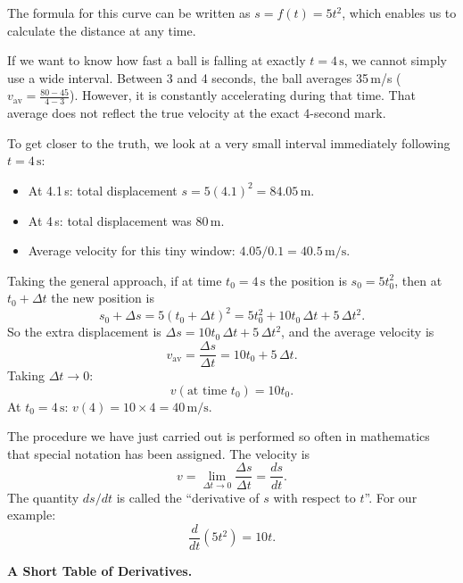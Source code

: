 The formula for this curve can be written as $s = f(t) = 5t^2$, which enables us to calculate
the distance at any time.

If we want to know how fast a ball is falling at exactly $t=4\,\text{s}$, we cannot simply
use a wide interval. Between 3 and 4 seconds, the ball averages 35\,m/s
($v_\text{av}=\frac{80-45}{4-3}$). However, it is constantly accelerating during that time.
That average does not reflect the true velocity at the exact 4-second mark.

To get closer to the truth, we look at a very small interval immediately following $t=4\,\text{s}$:
\begin{itemize}
  \item At 4.1\,s: total displacement $s=5(4.1)^2=84.05\,\text{m}$.
  \item At 4\,s: total displacement was 80\,m.
  \item Average velocity for this tiny window: $4.05/0.1=40.5\,\text{m/s}$.
\end{itemize}

Taking the general approach, if at time $t_0=4\,\text{s}$ the position is $s_0=5t_0^2$, then at
$t_0+\Delta t$ the new position is
\[
  s_0+\Delta s = 5(t_0+\Delta t)^2 = 5t_0^2+10t_0\,\Delta t+5\,\Delta t^2.
\]
So the extra displacement is $\Delta s = 10t_0\,\Delta t+5\,\Delta t^2$, and the average velocity is
\begin{equation}
  v_\text{av} = \frac{\Delta s}{\Delta t} = 10t_0+5\,\Delta t.
\end{equation}
Taking $\Delta t\to 0$:
\[
  v(\text{at time }t_0) = 10t_0.
\]
At $t_0=4\,\text{s}$: $v(4)=10\times4=40\,\text{m/s}$.

The procedure we have just carried out is performed so often in mathematics that special notation
has been assigned. The velocity is
\begin{equation}
  v = \lim_{\Delta t\to 0}\frac{\Delta s}{\Delta t} = \frac{ds}{dt}.
\end{equation}
The quantity $ds/dt$ is called the ``derivative of $s$ with respect to $t$''. For our example:
\[
  \frac{d}{dt}(5t^2) = 10t.
\]

\textbf{A Short Table of Derivatives.}

